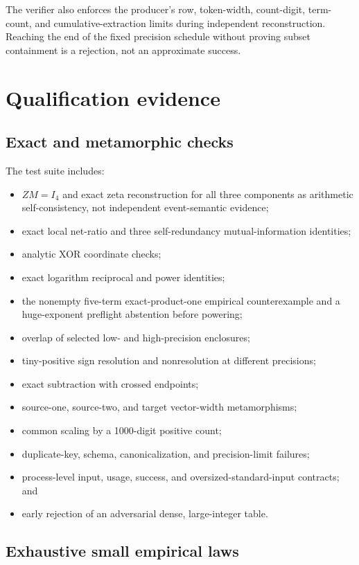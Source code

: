 \documentclass[11pt]{article}
\theoremstyle{definition}
\begin{document}
The verifier also enforces the producer's row, token-width, count-digit, term-count, and
cumulative-extraction limits during independent reconstruction.  Reaching the end of the fixed
precision schedule without proving subset containment is a rejection, not an approximate success.

\section{Qualification evidence}

\subsection{Exact and metamorphic checks}

The test suite includes:
\begin{itemize}[leftmargin=*]
  \item $ZM=I_4$ and exact zeta reconstruction for all three components as arithmetic
  self-consistency, not independent event-semantic evidence;
  \item exact local net-ratio and three self-redundancy mutual-information identities;
  \item analytic XOR coordinate checks;
  \item exact logarithm reciprocal and power identities;
  \item the nonempty five-term exact-product-one empirical counterexample and a huge-exponent
        preflight abstention before powering;
  \item overlap of selected low- and high-precision enclosures;
  \item tiny-positive sign resolution and nonresolution at different precisions;
  \item exact subtraction with crossed endpoints;
  \item source-one, source-two, and target vector-width metamorphisms;
  \item common scaling by a 1000-digit positive count;
  \item duplicate-key, schema, canonicalization, and precision-limit failures;
  \item process-level input, usage, success, and oversized-standard-input contracts; and
  \item early rejection of an adversarial dense, large-integer table.
\end{itemize}

\subsection{Exhaustive small empirical laws}
\end{document}
